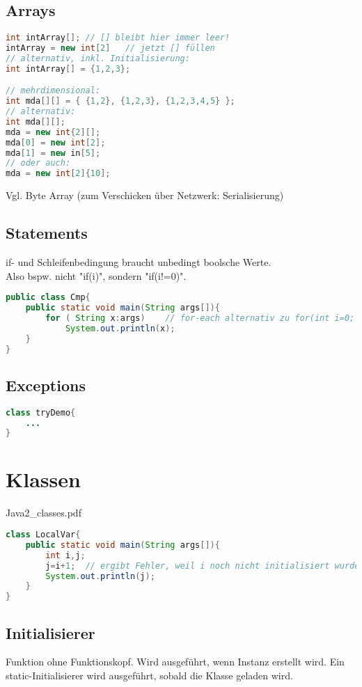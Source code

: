 \subsection{Arrays}
\begin{lstlisting}[language=Java]
int intArray[];	// [] bleibt hier immer leer!
intArray = new int[2]	// jetzt [] füllen
// alternativ, inkl. Initialisierung:
int intArray[] = {1,2,3};

// mehrdimensional:
int mda[][] = { {1,2}, {1,2,3}, {1,2,3,4,5} };
// alternativ:
int mda[][];
mda = new int{2][];
mda[0] = new int[2];
mda[1] = new in[5];
// oder auch:
mda = new int[2]{10];
\end{lstlisting}
Vgl. Byte Array (zum Verschicken über Netzwerk: Serialisierung)

\subsection{Statements}
if- und Schleifenbedingung braucht unbedingt boolsche Werte.\\
Also bspw. nicht "if(i)", sondern "if(i!=0)".

\begin{lstlisting}[language=Java]
public class Cmp{
	public static void main(String args[]){		
		for ( String x:args) 	// for-each alternativ zu for(int i=0; i<args.length; i++) {x=args[i]; System.out.println(x);}
			System.out.println(x);
	}
}
\end{lstlisting}

\subsection{Exceptions}
\begin{lstlisting}[language=Java]
class tryDemo{
	...
}
\end{lstlisting}

\section{Klassen}
Java2\_classes.pdf

\begin{lstlisting}[language=Java]
class LocalVar{
	public static void main(String args[]){
		int i,j;
		j=i+1;	// ergibt Fehler, weil i noch nicht initialisiert wurde.
		System.out.println(j);
	}
}
\end{lstlisting}

\subsection{Initialisierer}
Funktion ohne Funktionskopf. Wird ausgeführt, wenn Instanz erstellt wird. Ein static-Initialisierer wird ausgeführt, sobald die Klasse geladen wird.
